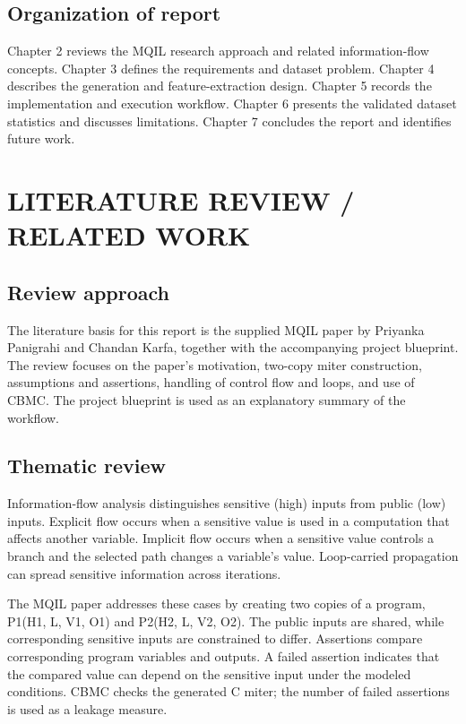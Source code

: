 \documentclass[12pt,a4paper,oneside]{report}
\begin{document}
\section{Organization of report}
Chapter 2 reviews the MQIL research approach and related information-flow concepts. Chapter 3 defines the requirements and dataset problem. Chapter 4 describes the generation and feature-extraction design. Chapter 5 records the implementation and execution workflow. Chapter 6 presents the validated dataset statistics and discusses limitations. Chapter 7 concludes the report and identifies future work.\par

\chapter{LITERATURE REVIEW / RELATED WORK}

\section{Review approach}
The literature basis for this report is the supplied MQIL paper by Priyanka Panigrahi and Chandan Karfa, together with the accompanying project blueprint. The review focuses on the paper's motivation, two-copy miter construction, assumptions and assertions, handling of control flow and loops, and use of CBMC. The project blueprint is used as an explanatory summary of the workflow.\par

\section{Thematic review}
Information-flow analysis distinguishes sensitive (high) inputs from public (low) inputs. Explicit flow occurs when a sensitive value is used in a computation that affects another variable. Implicit flow occurs when a sensitive value controls a branch and the selected path changes a variable's value. Loop-carried propagation can spread sensitive information across iterations.\par
The MQIL paper addresses these cases by creating two copies of a program, P1(H1, L, V1, O1) and P2(H2, L, V2, O2). The public inputs are shared, while corresponding sensitive inputs are constrained to differ. Assertions compare corresponding program variables and outputs. A failed assertion indicates that the compared value can depend on the sensitive input under the modeled conditions. CBMC checks the generated C miter; the number of failed assertions is used as a leakage measure.\par
\end{document}
